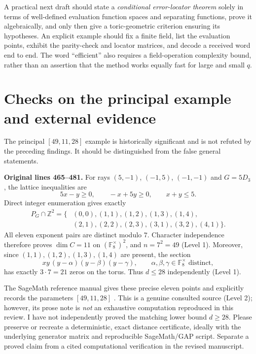 \documentclass[12pt,letterpaper]{article}
\newcommand{\F}{\mathbb F}
\newcommand{\Z}{\mathbb Z}
\newcommand{\level}[1]{\textsf{Level #1}}
\begin{document}
A practical next draft should state a \emph{conditional error-locator theorem} solely in terms of well-defined evaluation function spaces and separating functions, prove it algebraically, and only then give a toric-geometric criterion ensuring its hypotheses.  An explicit example should fix a finite field, list the evaluation points, exhibit the parity-check and locator matrices, and decode a received word end to end.  The word ``efficient'' also requires a field-operation complexity bound, rather than an assertion that the method works equally fast for large and small $q$.

\section{Checks on the principal example and external evidence}\label{sec:mainexample}
The principal $[49,11,28]$ example is historically significant and is not refuted by the preceding findings.  It should be distinguished from the false general statements.

\textbf{Original lines 465--481.}  For rays $(5,-1)$, $(-1,5)$, $(-1,-1)$ and $G=5D_3$, the lattice inequalities are
\[
5x-y\ge0,\qquad -x+5y\ge0,\qquad x+y\le5.
\]
Direct integer enumeration gives exactly
\[
\begin{split}
P_G\cap\Z^2=\{&(0,0),(1,1),(1,2),(1,3),(1,4),\\
&(2,1),(2,2),(2,3),(3,1),(3,2),(4,1)\}.
\end{split}
\]
All eleven exponent pairs are distinct modulo $7$.  Character independence therefore proves $\dim C=11$ on $(\F_8^\times)^2$, and $n=7^2=49$ (\level{1}).  Moreover, since $(1,1),(1,2),(1,3),(1,4)$ are present, the section
\[
x y\,(y-\alpha)(y-\beta)(y-\gamma),
\qquad \alpha,\beta,\gamma\in\F_8^\times\text{ distinct},
\]
has exactly $3\cdot7=21$ zeros on the torus.  Thus $d\le28$ independently (\level{1}).

The SageMath reference manual gives these precise eleven points and explicitly records the parameters $[49,11,28]$ \cite{Sa26}.  This is a genuine consulted source (\level{2}); however, its prose note is \emph{not} an exhaustive computation reproduced in this review.  I have not independently proved the matching lower bound $d\ge28$.  Please preserve or recreate a deterministic, exact distance certificate, ideally with the underlying generator matrix and reproducible SageMath/GAP script.  Separate a proved claim from a cited computational verification in the revised manuscript.
\end{document}

